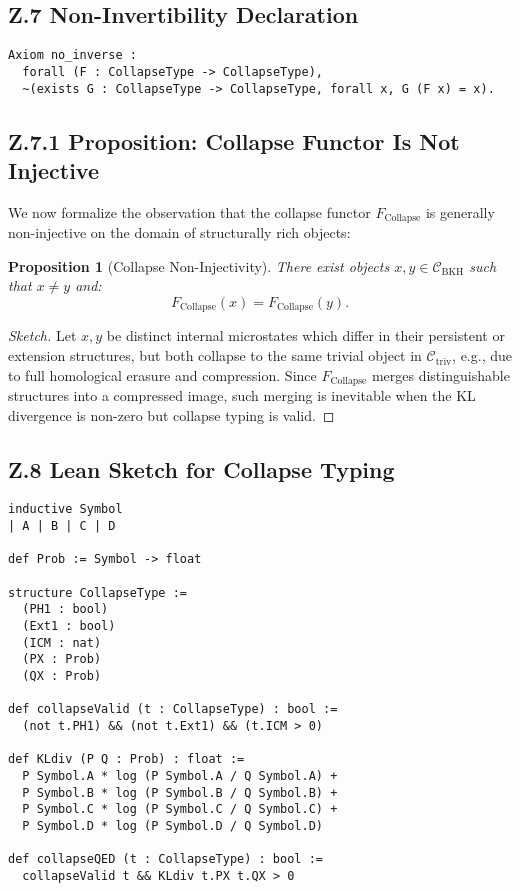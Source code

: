 \documentclass[11pt]{article}
\newtheorem{proposition}[theorem]{Proposition}
\begin{document}
\subsection*{Z.7 Non-Invertibility Declaration}

\begin{lstlisting}
Axiom no_inverse :
  forall (F : CollapseType -> CollapseType),
  ~(exists G : CollapseType -> CollapseType, forall x, G (F x) = x).
\end{lstlisting}

\subsection*{Z.7.1 Proposition: Collapse Functor Is Not Injective}

We now formalize the observation that the collapse functor \( F_{\mathrm{Collapse}} \) is generally non-injective on the domain of structurally rich objects:

\begin{proposition}[Collapse Non-Injectivity]
There exist objects \( x, y \in \mathcal{C}_{\mathrm{BKH}} \) such that \( x \ne y \) and:
\[
F_{\mathrm{Collapse}}(x) = F_{\mathrm{Collapse}}(y).
\]
\end{proposition}

\begin{proof}[Sketch]
Let \( x, y \) be distinct internal microstates which differ in their persistent or extension structures, but both collapse to the same trivial object in \( \mathcal{C}_{\mathrm{triv}} \), e.g., due to full homological erasure and compression. Since \( F_{\mathrm{Collapse}} \) merges distinguishable structures into a compressed image, such merging is inevitable when the KL divergence is non-zero but collapse typing is valid.
\end{proof}

\subsection*{Z.8 Lean Sketch for Collapse Typing}

\begin{lstlisting}[language=Lean]
inductive Symbol
| A | B | C | D

def Prob := Symbol -> float

structure CollapseType :=
  (PH1 : bool)
  (Ext1 : bool)
  (ICM : nat)
  (PX : Prob)
  (QX : Prob)

def collapseValid (t : CollapseType) : bool :=
  (not t.PH1) && (not t.Ext1) && (t.ICM > 0)

def KLdiv (P Q : Prob) : float :=
  P Symbol.A * log (P Symbol.A / Q Symbol.A) +
  P Symbol.B * log (P Symbol.B / Q Symbol.B) +
  P Symbol.C * log (P Symbol.C / Q Symbol.C) +
  P Symbol.D * log (P Symbol.D / Q Symbol.D)

def collapseQED (t : CollapseType) : bool :=
  collapseValid t && KLdiv t.PX t.QX > 0
\end{lstlisting}
\end{document}
